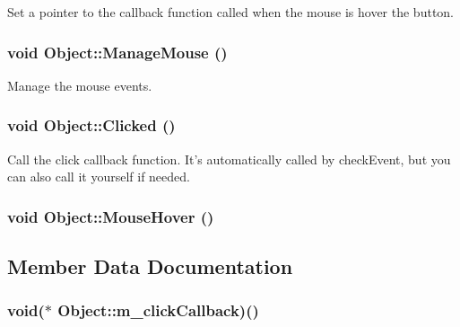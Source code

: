 Set a pointer to the callback function called when the mouse is hover the button. \hypertarget{classObject_d353628cfc37903c31e07f9179c7407f}{
\subsubsection[ManageMouse]{\setlength{\rightskip}{0pt plus 5cm}void Object::ManageMouse ()}}
\label{classObject_d353628cfc37903c31e07f9179c7407f}




Manage the mouse events. \hypertarget{classObject_8342d588d9294226206106e142c30e51}{
\subsubsection[Clicked]{\setlength{\rightskip}{0pt plus 5cm}void Object::Clicked ()}}
\label{classObject_8342d588d9294226206106e142c30e51}




Call the click callback function. It's automatically called by checkEvent, but you can also call it yourself if needed. \hypertarget{classObject_d3669e5b85439868eb7738f6d5a409ef}{
\subsubsection[MouseHover]{\setlength{\rightskip}{0pt plus 5cm}void Object::MouseHover ()}}
\label{classObject_d3669e5b85439868eb7738f6d5a409ef}




\subsection{Member Data Documentation}
\hypertarget{classObject_f7caaefc35c7091fcaab49a102394239}{
\subsubsection[m\_\-clickCallback]{\setlength{\rightskip}{0pt plus 5cm}void($\ast$ {\bf Object::m\_\-clickCallback})()}}
\label{classObject_f7caaefc35c7091fcaab49a102394239}


